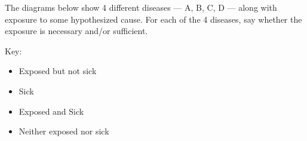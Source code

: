 \newcommand{\Person}[1]{
\draw[ultra thick] (#1) circle (.4cm);
}
\newcommand{\Exposed}[1]{
\draw[ultra thick,fill=gray!50] (#1) circle (.4cm);
}
\newcommand{\Sick}[1]{
\draw[ultra thick] (#1) -- +(.25,.25);
\draw[ultra thick] (#1) -- +(.25,-.25);
\draw[ultra thick] (#1) -- +(-.25,-.25);
\draw[ultra thick] (#1) -- +(-.25,.25);
}
\newcommand{\PersonSick}[1]{
\Person{#1}
\Sick{#1}
}
\newcommand{\ExposedSick}[1]{
\Exposed{#1}
\Sick{#1}
}

The diagrams below show 4 different diseases --- A, B, C, D --- along with exposure to
some hypothesized cause.  For each of the 4 diseases, say whether the
exposure is necessary and/or sufficient.

Key:
\begin{itemize}
\item Exposed but not sick 
\item Sick 
\item Exposed and Sick 
\item Neither exposed nor sick 
\end{itemize}


